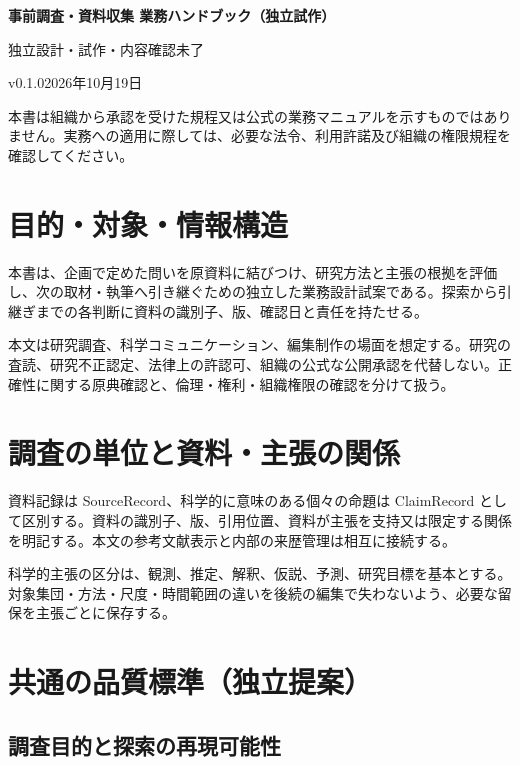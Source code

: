 \documentclass[a4paper,11pt]{article}
\begin{document}
\begin{center}
{\Large\bfseries 事前調査・資料収集 業務ハンドブック（独立試作）}\par\medskip
{\small 独立設計・試作・内容確認未了}\par
{\small v0.1.0\quad 2026年10月19日}\par
\end{center}
\vspace{6mm}
\noindent 本書は組織から承認を受けた規程又は公式の業務マニュアルを示すものではありません。実務への適用に際しては、必要な法令、利用許諾及び組織の権限規程を確認してください。\par
\tableofcontents
\clearpage
\section{目的・対象・情報構造}
\par 本書は、企画で定めた問いを原資料に結びつけ、研究方法と主張の根拠を評価し、次の取材・執筆へ引き継ぐための独立した業務設計試案である。探索から引継ぎまでの各判断に資料の識別子、版、確認日と責任を持たせる。\par\medskip
\par 本文は研究調査、科学コミュニケーション、編集制作の場面を想定する。研究の査読、研究不正認定、法律上の許認可、組織の公式な公開承認を代替しない。正確性に関する原典確認と、倫理・権利・組織権限の確認を分けて扱う。\par\medskip
\section{調査の単位と資料・主張の関係}
\par 資料記録は SourceRecord、科学的に意味のある個々の命題は ClaimRecord として区別する。資料の識別子、版、引用位置、資料が主張を支持又は限定する関係を明記する。本文の参考文献表示と内部の来歴管理は相互に接続する。\par\medskip
\par 科学的主張の区分は、観測、推定、解釈、仮説、予測、研究目標を基本とする。対象集団・方法・尺度・時間範囲の違いを後続の編集で失わないよう、必要な留保を主張ごとに保存する。\par\medskip
\section{共通の品質標準（独立提案）}
\subsection{調査目的と探索の再現可能性}
\end{document}
